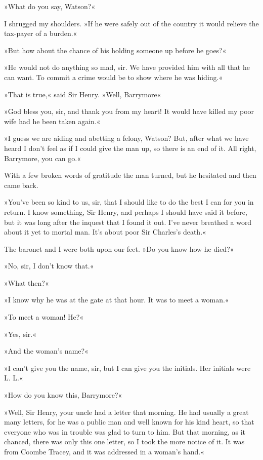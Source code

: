 »What do you say, Watson?«

I shrugged my shoulders. »If he were safely out of the country it would relieve the tax-payer of a burden.«

»But how about the chance of his holding someone up before he goes?«

»He would not do anything so mad, sir. We have provided him with all that he can want. To commit a crime would be to show where he was hiding.«

»That is true,« said Sir Henry. »Well, Barrymore\longdash «

»God bless you, sir, and thank you from my heart! It would have killed my poor wife had he been taken again.«

»I guess we are aiding and abetting a felony, Watson? But, after what we have heard I don't feel as if I could give the man up, so there is an end of it. All right, Barrymore, you can go.«

With a few broken words of gratitude the man turned, but he hesitated and then came back.

»You've been so kind to us, sir, that I should like to do the best I can for you in return. I know something, Sir Henry, and perhaps I should have said it before, but it was long after the inquest that I found it out. I've never breathed a word about it yet to mortal man. It's about poor Sir Charles's death.«

The baronet and I were both upon our feet. »Do you know how he died?«

»No, sir, I don't know that.«

»What then?«

»I know why he was at the gate at that hour. It was to meet a woman.«

»To meet a woman! He?«

»Yes, sir.«

»And the woman's name?«

»I can't give you the name, sir, but I can give you the initials. Her initials were L. L.«

»How do you know this, Barrymore?«

»Well, Sir Henry, your uncle had a letter that morning. He had usually a great many letters, for he was a public man and well known for his kind heart, so that everyone who was in trouble was glad to turn to him. But that morning, as it chanced, there was only this one letter, so I took the more notice of it. It was from Coombe Tracey, and it was addressed in a woman's hand.«


